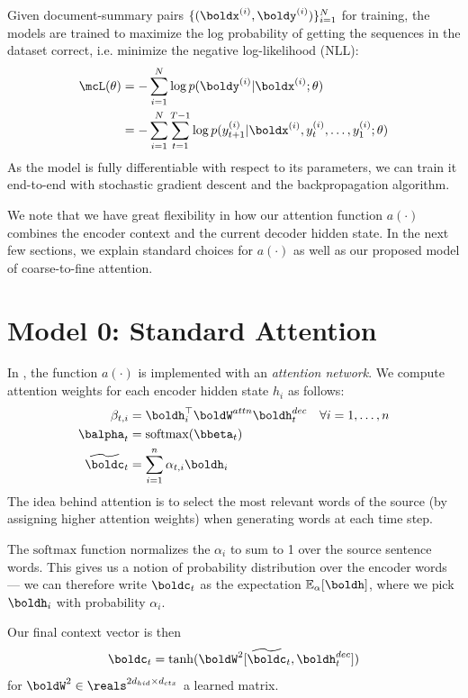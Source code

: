 \documentclass[12pt]{report}
\begin{document}
Given document-summary pairs $\{ (\boldx^{(i)}, \boldy^{(i)}) \}_{i=1}^N$ for training, the models are trained to maximize the log probability of getting the sequences in the dataset correct, i.e. minimize the negative log-likelihood (NLL):
\begin{align*}
\mcL(\theta) &= - \sum_{i=1}^N \log p(\boldy^{(i)} | \boldx^{(i)}; \theta)  \\
&= -\sum_{i=1}^N \sum_{t=1}^{T-1} \log p(y_{t+1}^{(i)} | \boldx^{(i)}, y_t^{(i)}, \ldots, y_1^{(i)} ; \theta)
\end{align*}
As the model is fully differentiable with respect to its parameters, we can train it end-to-end with stochastic gradient descent and the backpropagation algorithm.

We note that we have great flexibility in how our attention function $a(\cdot)$ combines the encoder context and the current decoder hidden state. In the next few sections, we explain standard choices for $a(\cdot)$ as well as our proposed model of coarse-to-fine attention.

\section{Model 0: Standard Attention}

In \citet{bahdanau2014neural}, the function $a(\cdot)$ is implemented with an \emph{attention network}. We compute attention weights for each encoder hidden state $h_i$ as follows:
\begin{align}
\beta_{t,i} &= \boldh_i^\top \boldW^{attn} \boldh_t^{dec} \quad \forall i = 1, \ldots, n\\
\balpha_t &= \mathrm{softmax}(\bbeta_t) \\
\widetilde{\boldc}_t &= \sum_{i=1}^n \alpha_{t,i} \boldh_i
\end{align}
The idea behind attention is to select the most relevant words of the source (by assigning higher attention weights) when generating words at each time step.

The $\mathrm{softmax}$ function normalizes the $\alpha_i$ to sum to 1 over the source sentence words. This gives us a notion of probability distribution over the encoder words --- we can therefore write $\boldc_t$ as the expectation $\mathbb{E}_\alpha[\boldh]$, where we pick $\boldh_i$ with probability $\alpha_i$.

Our final context vector is then
\begin{equation}
\boldc_t = \tanh(\boldW^2[\widetilde{\boldc}_t, \boldh_t^{dec}])
\end{equation}
for $\boldW^2 \in \reals^{2d_{hid} \times d_{ctx}}$ a learned matrix.
\end{document}
